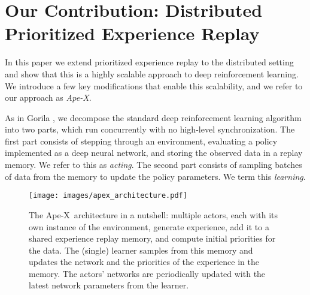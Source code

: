 \documentclass{article} \PassOptionsToPackage{usenames,dvipsnames}{xcolor}
\def\apex{Ape-X}
\def\smallcaption#1{\caption{\small #1}\vspace{-0.4cm}}
\begin{document}
\section{Our Contribution: Distributed Prioritized Experience Replay}

In this paper we extend prioritized experience replay to the distributed setting and show that this is a highly scalable approach to deep reinforcement learning. We introduce a few key modifications that enable this scalability, and we refer to our approach as \emph{\apex}.

As in Gorila \citep{gorila}, we decompose the standard deep reinforcement learning algorithm into two parts, which run concurrently with no high-level synchronization.  The first part consists of stepping through an environment, evaluating a policy implemented as a deep neural network, and storing the observed data in a replay memory. We refer to this as \emph{acting}. The second part consists of sampling batches of data from the memory to update the policy parameters. We term this \emph{learning}. 

\begin{figure}[t!]
\centerline{
\texttt{[image: images/apex\_architecture.pdf]}
}
\smallcaption{
The \apex\ architecture in a nutshell: multiple actors, each with its own instance of the environment, generate experience, add it to a shared experience replay memory, and compute initial priorities for the data. The (single) learner samples from this memory and updates the network and the priorities of the experience in the memory. The actors' networks are periodically updated with the latest network parameters from the learner.
}\label{fig:architecture}

\end{figure}
\end{document}
